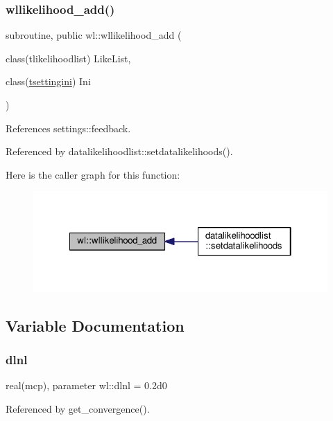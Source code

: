 \subsubsection{\texorpdfstring{wllikelihood\+\_\+add()}{wllikelihood\_add()}}
{\footnotesize\ttfamily subroutine, public wl\+::wllikelihood\+\_\+add (\begin{DoxyParamCaption}\item[{class(tlikelihoodlist)}]{Like\+List,  }\item[{class(\mbox{\hyperlink{structsettings_1_1tsettingini}{tsettingini}})}]{Ini }\end{DoxyParamCaption})}



References settings\+::feedback.



Referenced by datalikelihoodlist\+::setdatalikelihoods().

Here is the caller graph for this function\+:
\nopagebreak
\begin{figure}[H]
\begin{center}
\leavevmode
\includegraphics[width=322pt]{namespacewl_a622c1e8033fcc6aa3474f2fd57263f4b_icgraph}
\end{center}
\end{figure}


\subsection{Variable Documentation}
\mbox{\label{namespacewl_a3359e7d1e42c8d0976460988d6f1f095}} 
\subsubsection{\texorpdfstring{dlnl}{dlnl}}
{\footnotesize\ttfamily real(mcp), parameter wl\+::dlnl = 0.\+2d0\hspace{0.3cm}{\ttfamily [private]}}



Referenced by get\+\_\+convergence().

